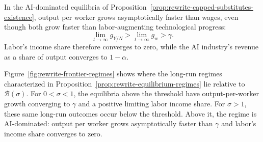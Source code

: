 \begin{remark}
\label{rem:rewrite-ai-revenue-share}
In the AI-dominated equilibria of
Proposition~\ref{prop:rewrite-capped-substitutes-existence}, output per
worker grows asymptotically faster than wages, even though both grow
faster than labor-augmenting technological progress:
\[
 \lim_{t\to\infty}g_{Y/N}>\lim_{t\to\infty}g_w>\gamma.
\]
Labor's income share therefore converges to zero, while the AI industry's revenue as a share of output converges to $1-\alpha$.
\end{remark}

Figure~\ref{fig:rewrite-frontier-regimes} shows where the long-run regimes
characterized in Proposition~\ref{prop:rewrite-equilibrium-regimes} lie
relative to $\mathcal B(\sigma)$. For $0<\sigma<1$, the equilibria above
the threshold have output-per-worker growth converging to $\gamma$ and a
positive limiting labor income share. For $\sigma>1$, these same long-run
outcomes occur below the threshold. Above it, the regime is AI-dominated:
output per worker grows asymptotically faster than $\gamma$ and labor's
income share converges to zero.

